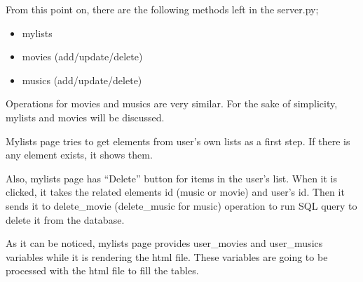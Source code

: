 \documentclass[letterpaper,10pt,english]{sphinxmanual}
\begin{document}
From this point on, there are the following methods left in the server.py;
\begin{itemize}
\item {} 
mylists

\item {} 
movies (add/update/delete)

\item {} 
musics (add/update/delete)

\end{itemize}

Operations for movies and musics are very similar.
For the sake of simplicity, mylists and movies will be discussed.

Mylists page tries to get elements from user’s own lists as a first step.
If there is any element exists, it shows them.

Also, mylists page has “Delete” button for items in the user’s list.
When it is clicked, it takes the related elements id (music or movie)
and user’s id. Then it sends it to delete\_movie (delete\_music for music) operation
to run SQL query to delete it from the database.

As it can be noticed, mylists page provides user\_movies and user\_musics variables
while it is rendering the html file. These variables are going to be processed
with the html file to fill the tables.
\end{document}
